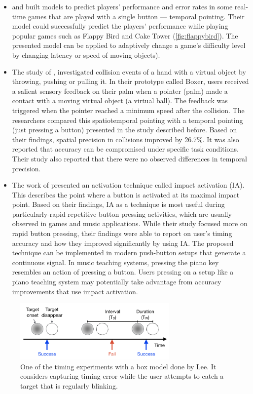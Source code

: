 \documentclass[manuscript,screen]{acmart}
\begin{document}
\begin{itemize}
\item \citet{lee2016modelling} and \citet{lee2018moving} built models to predict players’ performance and error rates in some real-time games that are played with a single button — temporal pointing. Their model could successfully predict the players’ performance while playing popular games such as Flappy Bird and Cake Tower (\ref{fig:flappybird}). The presented model can be applied to adaptively change a game’s difficulty level by changing latency or speed of moving objects). 
\item The study of \citet{lee2017boxer}, investigated collision events of a hand with a virtual object by throwing, pushing or pulling it. In their prototype called Boxer, users received a salient sensory feedback on their palm when a pointer (palm) made a contact with a moving virtual object (a virtual ball). The feedback was triggered when the pointer reached a minimum speed after the collision. The researchers compared this spatiotemporal pointing with a temporal pointing (just pressing a button) presented in the study described before. Based on their findings, spatial precision in collisions improved by 26.7\%. It was also reported that accuracy can be compromised under specific task conditions. Their study also reported that there were no observed differences in temporal precision.
\item The work of \citet{kim2018impact} presented an activation technique called impact activation (IA). This describes the point where a button is activated at its maximal impact point. Based on their findings, IA as a technique is most useful during particularly-rapid repetitive button pressing activities, which are usually observed in games and music applications. While their study focused more on rapid button pressing, their findings were able to report on user’s timing accuracy and how they improved significantly by using IA. The proposed technique can be implemented in modern push-button setups that generate a continuous signal. In music teaching systems, pressing the piano key resembles an action of pressing a button. Users pressing on a setup like a piano teaching system may potentially take advantage from accuracy improvements that use impact activation. 
\end{itemize}

\begin{figure}[t]
\centering
 \includegraphics[width=8cm]{figures/boxmodel.png}
    \caption{One of the timing experiments with a box model done by Lee. It considers capturing timing error while the user attempts to catch a target that is regularly blinking.
    }\label{fig:boxmodel}
\end{figure}
\end{document}
